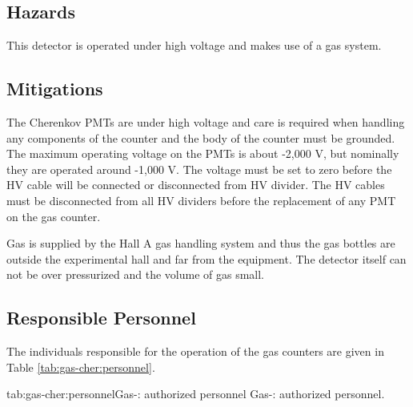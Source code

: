 \begin{safetyen}{0}{0}

\subsection{Hazards}

This detector is operated under high voltage and makes use of a gas system.

\subsection{Mitigations}

The Cherenkov PMTs are under high voltage and care is required when handling any 
components of the counter and the body of the \Cherenkov{} counter must be grounded. 
The maximum operating voltage on the PMTs is about -2,000 V, but
nominally they are operated around -1,000 V. The voltage must be set to
zero before the HV cable will be connected or disconnected from HV divider.
The HV cables must be disconnected from all HV dividers before the replacement
of any PMT on the gas \Cherenkov{} counter. 


Gas is supplied by the Hall A gas handling system and thus the gas bottles are outside
the experimental hall and far from the equipment.   The detector itself can not be over
pressurized and the volume of gas small.

\subsection{Responsible Personnel} 

The individuals responsible for the operation 
of the gas \Cherenkov{} counters are given in Table \ref{tab:gas-cher:personnel}.

\begin{namestab}{tab:gas-cher:personnel}{Gas-\Cherenkov{}: authorized personnel}{%
      Gas-\Cherenkov{}: authorized personnel.}
  \JackSegal{}
\end{namestab}
\end{safetyen}








